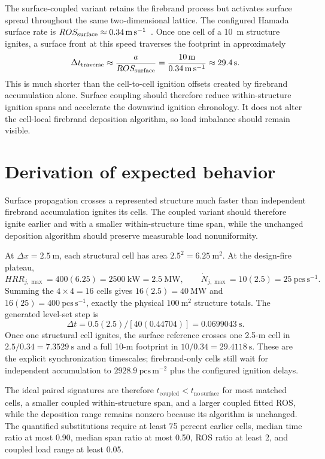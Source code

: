 The surface-coupled variant retains the firebrand process but activates surface
spread throughout the same two-dimensional lattice. The configured Hamada
surface rate is
\(ROS_{\rm surface}\approx\SI{0.34}{m.s^{-1}}\)~\cite{Qin2025}. Once one cell of a
\SI{10}{m} structure ignites, a surface front at this speed traverses the
footprint in approximately
\[
  \Delta t_{\rm traverse}
  \approx \frac{a}{ROS_{\rm surface}}
  =\frac{\SI{10}{m}}{\SI{0.34}{m.s^{-1}}}
  \approx\SI{29.4}{s}.
\]
This is much shorter than the cell-to-cell ignition offsets created by
firebrand accumulation alone. Surface coupling should therefore reduce
within-structure ignition spans and accelerate the downwind ignition
chronology. It does not alter the cell-local firebrand deposition algorithm,
so load imbalance should remain visible.

\section{Derivation of expected behavior}
Surface propagation crosses a represented structure much faster than independent firebrand accumulation ignites its cells. The coupled variant should therefore ignite earlier and with a smaller within-structure time span, while the unchanged deposition algorithm should preserve measurable load nonuniformity.

At \(\Delta x=2.5~\mathrm{m}\), each structural cell has area
\(2.5^2=6.25~\mathrm{m^2}\).  At the design-fire plateau,
\[
 HRR_{j,\max}=400(6.25)=2500~\mathrm{kW}=2.5~\mathrm{MW},
 \qquad \dot N_{j,\max}=10(2.5)=25~\mathrm{pcs\,s^{-1}}.
\]
Summing the \(4\times4=16\) cells gives
\(16(2.5)=40~\mathrm{MW}\) and
\(16(25)=400~\mathrm{pcs\,s^{-1}}\), exactly the physical
\(100~\mathrm{m^2}\) structure totals.  The generated level-set step is
\[
 \Delta t=0.5(2.5)/[40(0.44704)]=0.0699043~\mathrm{s}.
\]
Once one structural cell ignites, the surface reference crosses one 2.5-m
cell in \(2.5/0.34=7.3529~\mathrm{s}\) and a full 10-m footprint in
\(10/0.34=29.4118~\mathrm{s}\).  These are the explicit synchronization
timescales; firebrand-only cells still wait for independent accumulation to
\(2928.9~\mathrm{pcs\,m^{-2}}\) plus the configured ignition delays.

The ideal paired signatures are therefore
\(t_{\mathrm{coupled}}<t_{\mathrm{no\ surface}}\) for most matched cells,
a smaller coupled within-structure span, and a larger coupled fitted ROS,
while the deposition range remains nonzero because its algorithm is unchanged.
The quantified substitutions require at least 75 percent earlier cells,
median time ratio at most 0.90, median span ratio at most 0.50, ROS ratio at
least 2, and coupled load range at least 0.05.

